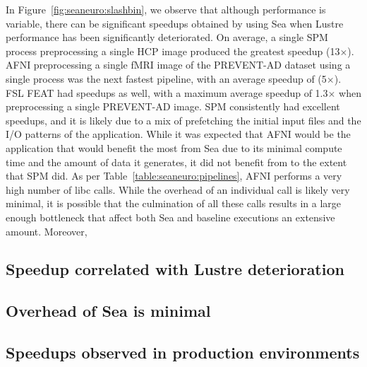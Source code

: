 In Figure~\ref{fig:seaneuro:slashbin}, we observe that although performance is variable,
there can be significant speedups obtained by using Sea when Lustre performance has been
significantly deteriorated. On average, a single SPM process preprocessing a single HCP
image produced the greatest speedup (13$\times$). AFNI preprocessing a single fMRI image of the
PREVENT-AD dataset using a single process was the next fastest pipeline, with an average speedup of (5$\times$).
FSL FEAT had speedups as well, with a maximum average speedup of 1.3$\times$ when preprocessing a single PREVENT-AD
image. SPM consistently had excellent speedups, and it is likely due to a mix of prefetching the initial input files
and the I/O patterns of the application. While it was expected that AFNI would be the application that would benefit the most from
Sea due to its minimal compute time and the amount of data it generates, it did not benefit from to the extent that SPM did.
As per Table~\ref{table:seaneuro:pipelines}, AFNI performs a very high number of libc calls. While the overhead of an individual call
is likely very minimal, it is possible that the culmination of all these calls results in a large enough bottleneck that affect both
Sea and baseline executions an extensive amount. Moreover, 

\subsection{Speedup correlated with Lustre deterioration}

\subsection{Overhead of Sea is minimal}

\subsection{Speedups observed in production environments}

